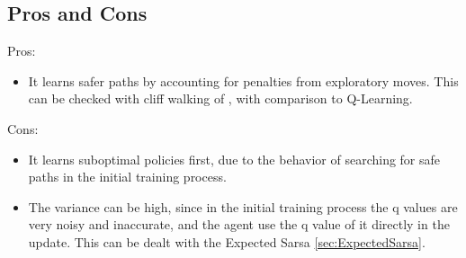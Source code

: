     \subsection{Pros and Cons}
        Pros:
        \begin{itemize}
            \item It learns safer paths by accounting for penalties from exploratory moves. This can be checked with cliff walking of \cite{Sutton2020}, with comparison to Q-Learning.
        \end{itemize}
        Cons:
        \begin{itemize}
            \item It learns suboptimal policies first, due to the behavior of searching for safe paths in the initial training process.
            \item The variance can be high, since in the initial training process the q values are very noisy and inaccurate, and the agent use the q value of it directly in the update.
                This can be dealt with the Expected Sarsa \ref{sec:ExpectedSarsa}.
        \end{itemize}